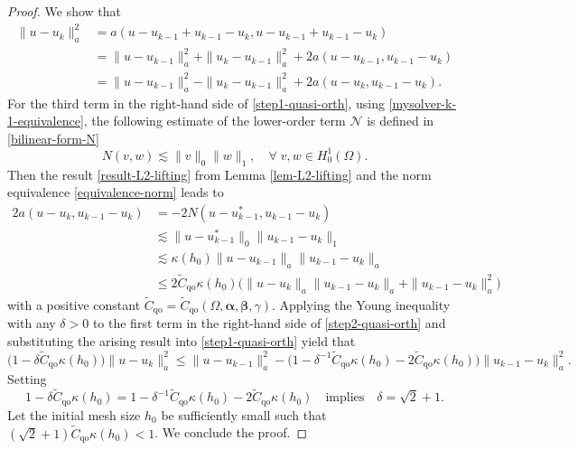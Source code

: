\documentclass[preprint,times]{elsarticle}%
\numberwithin{algorithm}{section}
\numberwithin{equation}{section}
\newcommand{\qoo}{\mathrm{qo}}
\newcommand{\anorm}[1]{\|#1\|_a}
\newcommand{\valpha}{\boldsymbol{\alpha}}
\newcommand{\vbeta}{\boldsymbol{\beta}}
\newcommand{\wtC}{\widetilde{C}}
\newcommand{\mcN}{\mathcal{N}}
\newcommand{\Ltw}[1]{\|#1\|_0}
\newcommand{\Hon}[1]{\|#1\|_1}
\def\leq{\leqslant}
\begin{document}
\begin{proof}
	We show that  
	\begin{align}
		\anorm{u-u_k}^2 &= a(u-u_{k-1}+u_{k-1}-u_k,u-u_{k-1}+u_{k-1}-u_k)
			   \nonumber\\
			&= \anorm{u-u_{k-1}}^2 + \anorm{u_k-u_{k-1}}^2 + 2a(u-u_{k-1},u_{k-1}-u_k)
               \nonumber\\
            &= \anorm{u-u_{k-1}}^2 - \anorm{u_k-u_{k-1}}^2 + 2a(u-u_k,u_{k-1}-u_k). 
	           \label{step1-quasi-orth}
	\end{align}
For the third term in the right-hand side of \eqref{step1-quasi-orth}, using  \eqref{mysolver-k-1-equivalence}, the following estimate of the lower-order term $\mcN$ is defined in \eqref{bilinear-form-N}
\begin{equation}\label{bilinear-N-B0}
	N(v,w) \lesssim \Ltw{v}\Hon{w}, \quad \forall \; v,w \in H_0^1(\Omega).
\end{equation}
Then the result \eqref{result-L2-lifting} from Lemma \ref{lem-L2-lifting} and the norm equivalence \eqref{equivalence-norm} leads to 
	\begin{align}
		2a(u-u_k,u_{k-1}-u_k) &= -2N(u-u_{k-1}^*,u_{k-1}-u_k)
				\nonumber\\
		  &\lesssim \Ltw{u-u_{k-1}^*}\Hon{u_{k-1}-u_k}
		  	    \nonumber\\
	      &\lesssim \kappa(h_0) \anorm{u-u_{k-1}}\anorm{u_{k-1}-u_k}
	      		\nonumber\\
	      &\leq 2\wtC_\qoo\kappa(h_0) \Big(\anorm{u-u_k}\anorm{u_{k-1}-u_k} 
	      						  + \anorm{u_{k-1}-u_k}^2\Big)
	            \label{step2-quasi-orth}
	\end{align}
with a positive constant $\wtC_\qoo = \wtC_\qoo(\Omega,\valpha,\vbeta,\gamma)$. 
Applying the Young inequality with any $\delta > 0$ to the first term in the right-hand side of \eqref{step2-quasi-orth} and substituting the arising result into \eqref{step1-quasi-orth} yield that 
	\begin{equation*}
		\Big(1-\delta \wtC_\qoo \kappa(h_0)\Big)\anorm{u-u_k}^2 \leq \anorm{u-u_{k-1}}^2  - \Big(1-\delta^{-1}\wtC_\qoo \kappa(h_0) - 2\wtC_\qoo\kappa(h_0)\Big)\anorm{u_{k-1}-u_k}^2. 
	\end{equation*}
Setting
	\begin{equation*}
		1 - \delta \wtC_\qoo \kappa(h_0) = 1-\delta^{-1}\wtC_\qoo \kappa(h_0) - 2\wtC_\qoo\kappa(h_0) \quad \text{implies} \quad \delta = \sqrt{2} + 1. 
	\end{equation*}
Let the initial mesh size $h_0$ be sufficiently small such that $(\sqrt{2}+1)\wtC_\qoo \kappa(h_0) < 1$. We conclude the proof. 
\end{proof}
\end{document}
